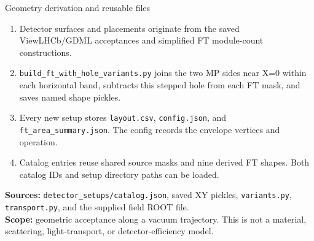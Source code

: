 \documentclass[aspectratio=169,10pt]{beamer}
\begin{document}
\begin{frame}{Geometry derivation and reusable files}
\small
\begin{enumerate}
\item Detector surfaces and placements originate from the saved ViewLHCb/GDML
acceptances and simplified FT module-count constructions.
\item \texttt{build\_ft\_with\_hole\_variants.py} joins the two MP sides near X=0
within each horizontal band, subtracts this stepped hole from each FT
mask, and saves named shape pickles.
\item Every new setup stores \texttt{layout.csv}, \texttt{config.json}, and
\texttt{ft\_area\_summary.json}. The config records the envelope vertices and operation.
\item Catalog entries reuse shared source masks and nine derived FT shapes.
Both catalog IDs and setup directory paths can be loaded.
\end{enumerate}
\vspace{3mm}
\textbf{Sources:} \texttt{detector\_setups/catalog.json}, saved XY pickles,
\texttt{variants.py}, \texttt{transport.py}, and the supplied field ROOT file.\\[2mm]
\textbf{Scope:} geometric acceptance along a vacuum trajectory. This is not a
material, scattering, light-transport, or detector-efficiency model.
\end{frame}
\end{document}
